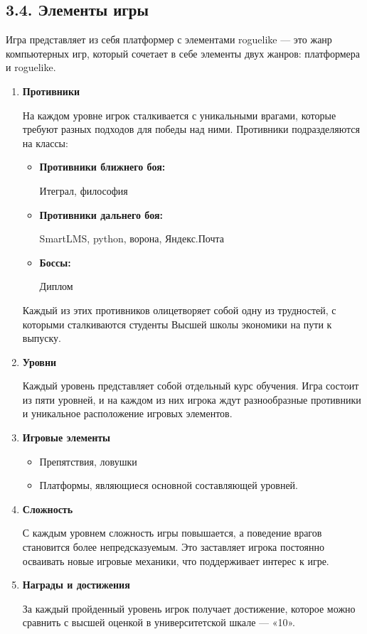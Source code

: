 \subsection*{3.4. Элементы игры}

Игра представляет из себя платформер с элементами roguelike — это жанр компьютерных игр, который сочетает в себе элементы двух  жанров: платформера и roguelike.  

\begin{enumerate}
	\item \textbf{Противники} \par
	На каждом уровне игрок сталкивается с уникальными врагами, которые требуют разных подходов для победы над ними.
	Противники подразделяются на классы:
	\begin{itemize}
		\item \textbf{Противники ближнего боя:} \par
			Итеграл, философия
		\item \textbf{Противники дальнего боя:} \par
			SmartLMS, python, ворона, Яндекс.Почта
        \item \textbf{Боссы:} \par
            Диплом
	\end{itemize}
   Каждый из этих противников олицетворяет собой одну из трудностей, с которыми сталкиваются студенты Высшей школы экономики на пути к выпуску.
    \item \textbf{Уровни} \par
 Каждый уровень представляет собой отдельный курс обучения. Игра состоит из пяти уровней, и на каждом из них игрока ждут разнообразные противники и уникальное расположение игровых элементов.
    \item \textbf{Игровые элементы} \par
    \begin{itemize}
		\item Препятствия, ловушки
		\item Платформы, являющиеся основной составляющей уровней.
	\end{itemize}
 \item \textbf{Сложность} \par
 С каждым уровнем сложность игры повышается, а поведение врагов становится более непредсказуемым. Это заставляет игрока постоянно осваивать новые игровые механики, что поддерживает интерес к игре. 
 \item \textbf{Награды и достижения} \par
   За каждый пройденный уровень игрок получает достижение, которое можно сравнить с высшей оценкой в университетской шкале — «10». 
    
\end{enumerate}
